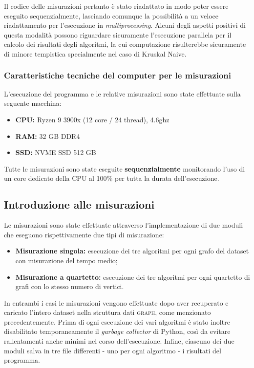 Il codice delle misurazioni pertanto è stato riadattato in modo poter essere eseguito sequenzialmente, lasciando comunque la possibilità a un veloce riadattamento per l'esecuzione in \textit{multiprocessing}. Alcuni degli aspetti positivi di questa modalità possono riguardare sicuramente l'esecuzione parallela per il calcolo dei risultati degli algoritmi, la cui computazione risulterebbe sicuramente di minore tempistica specialmente nel caso di Kruskal Naive.   

\subsubsection{Caratteristiche tecniche del computer per le misurazioni} 

L'esecuzione del programma e le relative misurazioni sono state effettuate sulla seguente macchina:
\begin{itemize}
    \item \textbf{CPU:} Ryzen 9 3900x (12 core / 24 thread), 4.6ghz
    \item \textbf{RAM:} 32 GB DDR4 
    \item \textbf{SSD:} NVME SSD 512 GB
\end{itemize}

\noindent Tutte le misurazioni sono state eseguite \textbf{sequenzialmente} monitorando l'uso di un core dedicato della CPU al 100\% per tutta la durata dell'esecuzione.


\subsection{Introduzione alle misurazioni} 

Le misurazioni sono state effettuate attraverso l'implementazione di due moduli che eseguono rispettivamente due tipi di misurazione:

\begin{itemize}
    \item \textbf{Misurazione singola:} esecuzione dei tre algoritmi per ogni grafo del dataset con misurazione del tempo medio;
    \item \textbf{Misurazione a quartetto:} esecuzione dei tre algoritmi per ogni quartetto di grafi con lo stesso numero di vertici.
\end{itemize}

In entrambi i casi le misurazioni vengono effettuate dopo aver recuperato e caricato l'intero dataset nella struttura dati \textsc{graph}, come menzionato precedentemente.
Prima di ogni esecuzione dei vari algoritmi è stato inoltre disabilitato temporaneamente il \textit{garbage collector} di Python, così da evitare rallentamenti anche minimi nel corso dell'esecuzione. Infine, ciascuno dei due moduli salva in tre file differenti - uno per ogni algoritmo - i risultati del programma.


